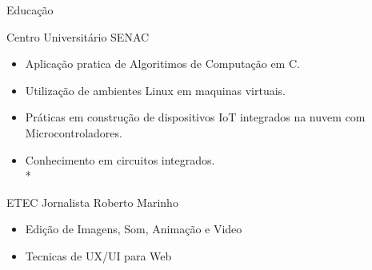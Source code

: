 \documentclass{article}
\newlength{\tabin}
\newlength{\secsep}
\newcommand{\lineunder}{\vspace*{-8pt} \\ \hspace*{-6pt} \hrulefill \\ \vspace*{-15pt}}
\newenvironment{tabbedsection}[1]{
  \begin{list}{}{
      \setlength{\itemsep}{0pt}
      \setlength{\labelsep}{0pt}
      \setlength{\labelwidth}{0pt}
      \setlength{\leftmargin}{\tabin}
      \setlength{\rightmargin}{\tabin}
      \setlength{\listparindent}{0pt}
      \setlength{\parsep}{0pt}
      \setlength{\parskip}{0pt}
      \setlength{\partopsep}{0pt}
      \setlength{\topsep}{#1}
    }
  \item[]
}{\end{list}}
\newenvironment{resume_section}[1]{
  \filbreak
  \vspace{2\secsep}
  \textsc{\large#1}
  \lineunder
  \begin{tabbedsection}{\secsep}
}{\end{tabbedsection}}
\newenvironment{resume_subsection}[2][]{
  \textbf{#2} \hfill {\footnotesize #1} \hspace{2em}
  \begin{tabbedsection}{0.5\secsep}
}{\end{tabbedsection}}
\newenvironment{subitems}{
  \renewcommand{\labelitemi}{-}
  \begin{itemize}
      \setlength{\labelsep}{1em}
}{\end{itemize}}
\begin{document}
\begin{resume_section}{Educação}
  \begin{resume_subsection}{Centro Universitário SENAC}
    \begin{subitems}
      \item Aplicação pratica de Algoritimos de Computação em C.
      \item Utilização de ambientes Linux em maquinas virtuais.
      \item	Práticas em construção de dispositivos IoT integrados na nuvem com Microcontroladores.
      \item Conhecimento em circuitos integrados. \\*
    \end{subitems}
  \end{resume_subsection}
  
  \begin{resume_subsection}{ETEC Jornalista Roberto Marinho}
    \begin{subitems}
      \item Edição de Imagens, Som, Animação e Video
      \item Tecnicas de UX/UI para Web
     \end{subitems}
  \end{resume_subsection}
\end{resume_section}
\end{document}
